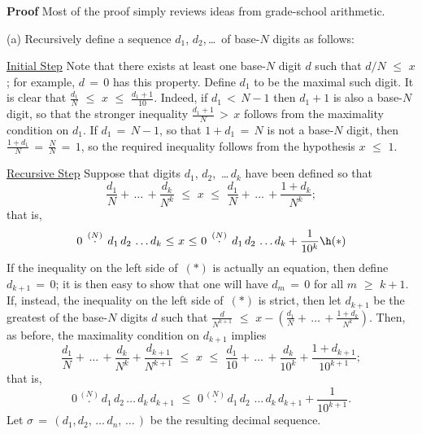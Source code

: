         {\bf Proof} Most of the proof simply reviews ideas from grade-school arithmetic.

\V

        (a) Recursively define a sequence $d_{1}$, $d_{2}$,\,{\ldots}\, of base-$N$ digits as follows:

        \h \underline{Initial Step} Note that there exists at least one base-$N$ digit $d$ such that $d/N\,\,{\leq}\,\,x$; for example, $d \,=\, 0$ has this property.
    Define $d_{1}$ to be the maximal such digit. It is clear that ${\displaystyle \frac{d_{1}}{N}\,\,{\leq}\,\,x\,\,{\leq}\,\,\frac{d_{1} + 1}{10}}$.
    Indeed, if $d_{1}\,<\,N-1$ then $d_{1}+1$ is also a base-$N$ digit, so that the stronger inequality
    ${\displaystyle \frac{d_{1} + 1}{N}\,>\,x}$ follows from the maximality condition on $d_{1}$.
    If $d_{1} \,=\, N-1$, so that $1+d_{1} \,=\, N$ is not a base-$N$ digit, then ${\displaystyle \frac{1+d_{1} }{N} \,=\, \frac{N}{N} \,=\, 1}$,
    so the required inequality follows from the hypothesis $x\,\,{\leq}\,\,1$.

        \h \underline{Recursive Step} Suppose that digits $d_{1}$, $d_{2}$, \,{\ldots}\,$d_{k}$ have been defined so that
        \begin{displaymath}
        \frac{d_{1}}{N} + \,{\ldots}\, + \frac{d_{k}}{N^{k}}
    \,\,{\leq}\,\,
        x
    \,\,{\leq}\,\,
        \frac{d_{1}}{N} + \,{\ldots}\, + \frac{1+d_{k}}{N^{k}};
        \end{displaymath}
    that is,
        \begin{displaymath}
        0\,\stackrel{(N)}{.}\,d_{1}\,d_{2}\,\,{\ldots}\,d_{k} \,\,{\leq}\,\, x\,\,{\leq}\,\,
        0\,\stackrel{(N)}{.}\,d_{1}\,d_{2}\,\,{\ldots}\,d_{k} + \frac{1}{10^{k}} \h ({\ast})
        \end{displaymath}
    If the inequality on the left side of~$({\ast})$ is actually an equation, then define $d_{k+1} \,=\, 0$;
    it is then easy to show that one will have $d_{m} \,=\, 0$ for all $m\,\,{\geq}\,\,k+1$.
    If, instead, the inequality on the left side of~$({\ast})$ is strict, then let $d_{k+1}$ be the greatest of the base-$N$ digits $d$ such that
    ${\displaystyle \frac{d}{N^{k+1}}\,\,{\leq}\,\,x-\left(\frac{d_{1}}{N} + \,{\ldots}\, + \frac{1+d_{k}}{N^{k}}\right)}$.
    Then, as before, the maximality condition on $d_{k+1}$ implies
        \begin{displaymath}
        \frac{d_{1}}{N} + \,{\ldots}\, + \frac{d_{k}}{N^{k}} + \frac{d_{k+1}}{N^{k+1}}
    \,\,{\leq}\,\,
        x
    \,\,{\leq}\,\,
        \frac{d_{1}}{10} + \,{\ldots}\, + \frac{d_{k}}{10^{k}} + \frac{1+d_{k+1}}{10^{k+1}};
        \end{displaymath}
    that is,
        \begin{displaymath}
        0\,\stackrel{(N)}{.}\,d_{1}\,d_{2}\,{\ldots}\,d_{k}\,d_{k+1} 
    \,\,{\leq}\,\,
        0\,\stackrel{(N)}{.}\,d_{1}\,d_{2}\,\,{\ldots}\,d_{k}\,d_{k+1} + \frac{1}{10^{k+1}}.
        \end{displaymath}
        Let ${\sigma} \,=\, (d_{1}, d_{2},\,{\ldots}\,d_{n},\,{\ldots}\,)$ be the resulting decimal sequence.

